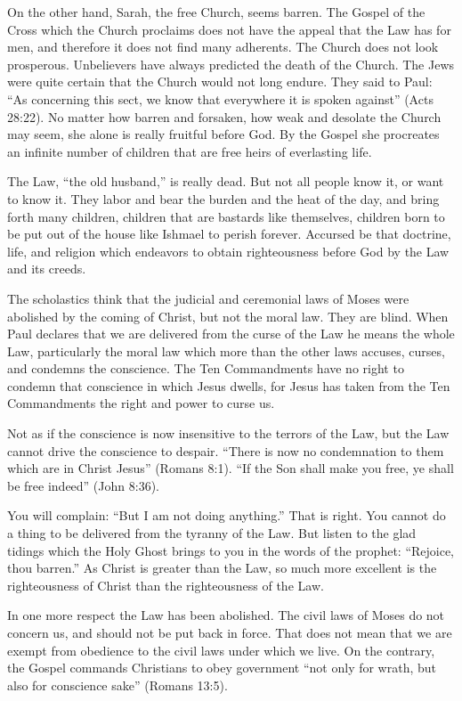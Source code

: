 On the other hand, Sarah, the free Church, seems barren. The Gospel of the Cross which the Church proclaims does not have the appeal that the Law has for men, and therefore it does not find many adherents. The Church does not look prosperous. Unbelievers have always predicted the death of the Church. The Jews were quite certain that the Church would not long endure. They said to Paul: “As concerning this sect, we know that everywhere it is spoken against” (Acts 28:22). No matter how barren and forsaken, how weak and desolate the Church may seem, she alone is really fruitful before God. By the Gospel she procreates an infinite number of children that are free heirs of everlasting life.

The Law, “the old husband,” is really dead. But not all people know it, or want to know it. They labor and bear the burden and the heat of the day, and bring forth many children, children that are bastards like themselves, children born to be put out of the house like Ishmael to perish forever. Accursed be that doctrine, life, and religion which endeavors to obtain righteousness before God by the Law and its creeds.

The scholastics think that the judicial and ceremonial laws of Moses were abolished by the coming of Christ, but not the moral law. They are blind. When Paul declares that we are delivered from the curse of the Law he means the whole Law, particularly the moral law which more than the other laws accuses, curses, and condemns the conscience. The Ten Commandments have no right to condemn that conscience in which Jesus dwells, for Jesus has taken from the Ten Commandments the right and power to curse us.

Not as if the conscience is now insensitive to the terrors of the Law, but the Law cannot drive the conscience to despair. “There is now no condemnation to them which are in Christ Jesus” (Romans 8:1). “If the Son shall make you free, ye shall be free indeed” (John 8:36).

You will complain: “But I am not doing anything.” That is right. You cannot do a thing to be delivered from the tyranny of the Law. But listen to the glad tidings which the Holy Ghost brings to you in the words of the prophet: “Rejoice, thou barren.” As Christ is greater than the Law, so much more excellent is the righteousness of Christ than the righteousness of the Law.

In one more respect the Law has been abolished. The civil laws of Moses do not concern us, and should not be put back in force. That does not mean that we are exempt from obedience to the civil laws under which we live. On the contrary, the Gospel commands Christians to obey government “not only for wrath, but also for conscience sake” (Romans 13:5).

